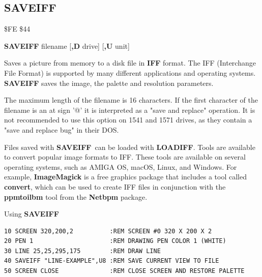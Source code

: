 \subsection{SAVEIFF}
\begin{description}[leftmargin=2cm,style=nextline]
\item [Token:] \$FE \$44
\item [Format:] {\bf SAVEIFF} filename [{\bf,D} drive] [{\bf,U} unit]
\item [Usage:]

   Saves a picture from memory to a disk file in {\bf IFF} format.
   The IFF (Interchange File Format) is supported by many different applications
   and operating systems. {\bf SAVEIFF} saves the image, the palette
   and resolution parameters.

   \filenamedefinition
   The maximum length of the filename is 16 characters.
   If the first character of the filename is an at sign '@' it
   is interpreted as a "save and replace" operation. It is not recommended
   to use this option on 1541 and 1571 drives, as they
   contain a "save and replace bug" in their DOS.

   \drivedefinition

   \unitdefinition


\item [Remarks:]
   Files saved with {\bf SAVEIFF} can be loaded with {\bf LOADIFF}.
   Tools are available to convert popular image formats to IFF. These tools
   are available on several operating systems, such as AMIGA OS, macOS, Linux, and Windows.
   For example, {\bf ImageMagick} is a free graphics package that includes a tool
   called {\bf convert}, which can be used to create IFF files in conjunction
   with the {\bf ppmtoilbm} tool from the {\bf Netbpm} package.

\item [Example:] Using {\bf SAVEIFF}
\begin{tcolorbox}[colback=black,coltext=white]
\verbatimfont{\codefont}
\begin{verbatim}
10 SCREEN 320,200,2          :REM SCREEN #0 320 X 200 X 2
20 PEN 1                     :REM DRAWING PEN COLOR 1 (WHITE)
30 LINE 25,25,295,175        :REM DRAW LINE
40 SAVEIFF "LINE-EXAMPLE",U8 :REM SAVE CURRENT VIEW TO FILE
50 SCREEN CLOSE              :REM CLOSE SCREEN AND RESTORE PALETTE
\end{verbatim}
\end{tcolorbox}
\end{description}

